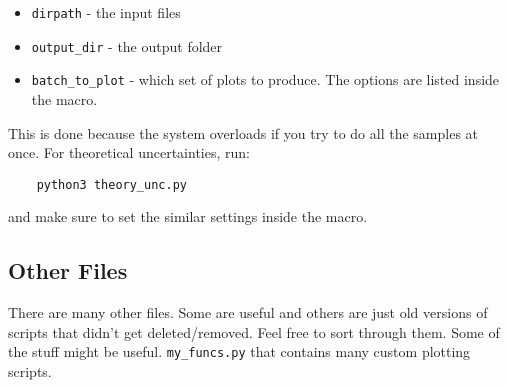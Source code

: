 \begin{itemize}
    \item \verb|dirpath| - the input files
    \item \verb|output_dir| - the output folder
    \item \verb|batch_to_plot| - which set of plots to produce. The options are listed inside the macro.
\end{itemize}

\noindent This is done because the system overloads if you try to do all the samples at once. For theoretical uncertainties, run:

\begin{verbatim}
    python3 theory_unc.py
\end{verbatim}

\noindent and make sure to set the similar settings inside the macro.

\subsection{Other Files}
There are many other files. Some are useful and others are just old versions of scripts that didn't get deleted/removed. Feel free to sort through them. Some of the stuff might be useful. \verb|my_funcs.py| that contains many custom plotting scripts.